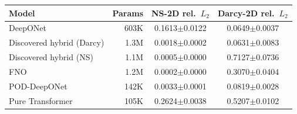 \begin{tabular}{lrcc}
\toprule
Model & Params & NS-2D rel.\ $L_2$ & Darcy-2D rel.\ $L_2$ \\
\midrule
DeepONet & 603K & 0.1613$\pm$0.0122 & 0.0649$\pm$0.0037 \\
Discovered hybrid (Darcy) & 1.3M & 0.0018$\pm$0.0002 & 0.0631$\pm$0.0083 \\
Discovered hybrid (NS) & 1.1M & 0.0005$\pm$0.0000 & 0.7127$\pm$0.0736 \\
FNO & 1.2M & 0.0002$\pm$0.0000 & 0.3070$\pm$0.0404 \\
POD-DeepONet & 142K & 0.0033$\pm$0.0001 & 0.0819$\pm$0.0028 \\
Pure Transformer & 105K & 0.2624$\pm$0.0038 & 0.5207$\pm$0.0102 \\
\bottomrule
\end{tabular}